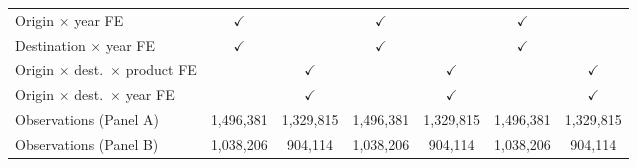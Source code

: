 \begin{tabular}{lcccccc}
Origin $\times$ year FE & $\checkmark$ &  & $\checkmark$ &  & $\checkmark$ &  \\
Destination $\times$ year FE & $\checkmark$ &  & $\checkmark$ &  & $\checkmark$ &  \\
Origin $\times$ dest.\ $\times$ product FE &  & $\checkmark$ &  & $\checkmark$ &  & $\checkmark$ \\
Origin $\times$ dest.\ $\times$ year FE &  & $\checkmark$ &  & $\checkmark$ &  & $\checkmark$ \\
Observations (Panel A) & 1,496,381 & 1,329,815 & 1,496,381 & 1,329,815 & 1,496,381 & 1,329,815 \\
Observations (Panel B) & 1,038,206 & 904,114 & 1,038,206 & 904,114 & 1,038,206 & 904,114 \\
\hline
\end{tabular}
